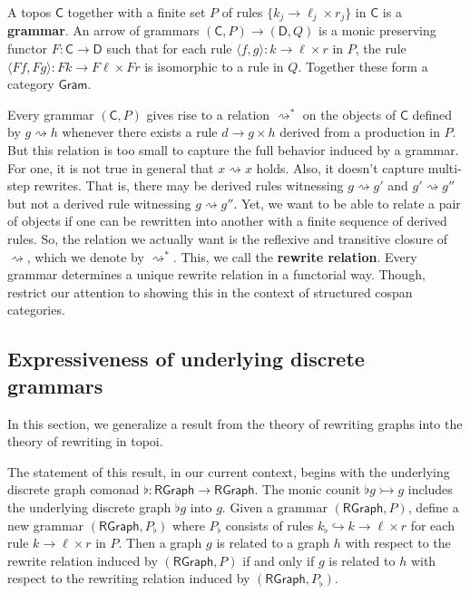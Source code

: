 \documentclass{amsart}
\newcommand{\C}{\cat{C}}
\newcommand{\D}{\cat{D}}
\newcommand{\RGraph}{\cat{RGraph}}
\newcommand{\Gram}{\cat{Gram}}
\newcommand{\defn}[1]{\textbf{#1}}
\newcommand{\cat}[1]{\mathsf{#1}}
\newcommand{\from}{\colon}
\newcommand{\monicto}{\rightarrowtail}
\newcommand{\dderiv}[2]{#1 \rightsquigarrow #2}
\newcommand{\deriv}[2]{#1 \rightsquigarrow^\ast #2}
\newcommand{\spn}[3]{#2 \to #1 \times #3}
\theoremstyle{remark}
\theoremstyle{definition}
\begin{document}
A topos $ \C $ together with a finite set $ P $ of rules
$ \{ \spn{\ell_j}{k_j}{r_j} \} $ in $ \cat{ C } $ is 
a \defn{grammar}. An arrow of grammars
$ ( \C , P ) \to ( \D , Q ) $ is a monic preserving functor
$ F \from \C \to \D $ such that for each rule
$ \langle f,g \rangle \from \spn{\ell}{k}{r} $ in $ P $, the
rule $ \langle Ff,Fg \rangle \from \spn{F\ell}{Fk}{Fr} $ is
isomorphic to a rule in $ Q $. Together these form a
category $ \Gram $.

Every grammar $ ( \C , P ) $ gives rise to a relation
$ \deriv{}{} $ on the objects of $ \C $ defined by
$ \dderiv{g}{h} $ whenever there exists a rule
$ \spn{g}{d}{h} $ derived from a production in $ P
$. But this relation is too small to capture the full
behavior induced by a grammar.  For one, it is not true in
general that $ \dderiv{x}{x} $ holds. Also, it doesn't
capture multi-step rewrites. That is, there may be
derived rules witnessing $ \dderiv{g}{g'} $ and
$ \dderiv{g'}{g''} $ but not a derived rule witnessing
$ \dderiv{g}{g''} $. Yet, we want to be able to relate a
pair of objects if one can be rewritten into another with a
finite sequence of derived rules. So, the relation we
actually want is the reflexive and transitive closure of
$ \rightsquigarrow $, which we denote by
$ \rightsquigarrow^\ast $.  This, we call the \defn{rewrite
  relation}.  Every grammar determines a unique rewrite
relation in a functorial way.  Though, restrict our attention to showing this
in the context of structured cospan categories.


\subsection{Expressiveness of underlying discrete grammars}
\label{sec:gen-result-graph-rewriting}

In this section, we generalize a result
\cite[Prop.~3.3]{Ehrig_GraphGram} from the theory of
rewriting graphs into the theory of rewriting in topoi.

The statement of this result, in our current context, begins
with the underlying discrete graph comonad
$ \flat \from \RGraph \to \RGraph $. The monic counit
$ \flat g \monicto g $ includes the underlying discrete
graph $ \flat g $ into $ g $.  Given a grammar
$ ( \RGraph , P ) $, define a new grammar
$ ( \RGraph , P_\flat ) $ where $ P_\flat $ consists of
rules $ k_\flat \hookrightarrow k \to \ell \times r $ for
each rule $ \spn{\ell}{k}{r} $ in $ P $. Then a graph $ g $
is related to a graph $ h $ with respect to the rewrite
relation induced by $ ( \RGraph , P ) $ if and only if $ g $
is related to $ h $ with respect to the rewriting relation
induced by $ ( \RGraph , P_\flat ) $.
\end{document}
